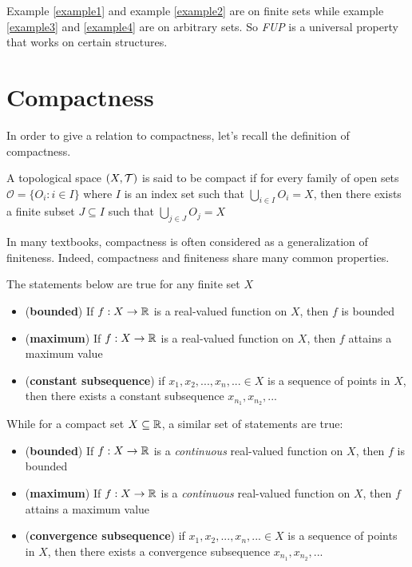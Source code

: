 \documentclass{article}
\begin{document}
Example \ref{example1} and example \ref{example2} are on finite sets while example \ref{example3} and \ref{example4} are on arbitrary sets. So \emph{FUP} is a universal property that works on certain structures.

\section{Compactness}

In order to give a relation to compactness, let's recall the definition of compactness.

\begin{definition}[Compactness]
    \label{def:compact}
    A topological space $(X, \mathcal{T})$ is said to be compact if for every family of open sets $\mathcal{O} = \{O_i: i \in I\}$ where $I$ is an index set such that $\bigcup_{i \in I} O_i = X$, then there exists a finite subset $J \subseteq I$ such that $\bigcup_{j \in J} O_j = X$
\end{definition}

In many textbooks, compactness is often considered as a generalization of finiteness. Indeed, compactness and finiteness share many common properties.

The statements \cite{tao2008compactness} below are true for any finite set $X$

\begin{itemize}
    \item (\textbf{bounded}) If $f: X \to \mathbb{R}$ is a real-valued function on $X$, then $f$ is bounded
    \item (\textbf{maximum}) If $f: X \to \mathbb{R}$ is a real-valued function on $X$, then $f$ attains a maximum value
    \item (\textbf{constant subsequence}) if $x_1, x_2, ..., x_n, ... \in X$ is a sequence of points in $X$, then there exists a constant subsequence $x_{n_1}, x_{n_2}, ...$
\end{itemize}

While for a compact set $X \subseteq \mathbb{R}$, a similar set of statements are true:

\begin{itemize}
    \item (\textbf{bounded}) If $f: X \to \mathbb{R}$ is a \emph{continuous} real-valued function on $X$, then $f$ is bounded
    \item (\textbf{maximum}) If $f: X \to \mathbb{R}$ is a \emph{continuous} real-valued function on $X$, then $f$ attains a maximum value
    \item (\textbf{convergence subsequence}) if $x_1, x_2, ..., x_n, ... \in X$ is a sequence of points in $X$, then there exists a convergence subsequence $x_{n_1}, x_{n_2}, ...$
\end{itemize}
\end{document}
